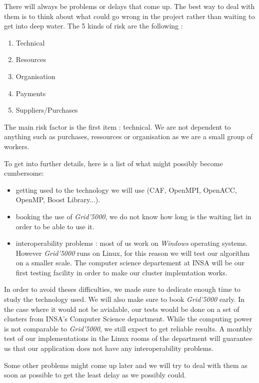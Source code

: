 There will always be problems or delays that come up. The best way to deal with them is to think about what could go wrong in the project rather than waiting to get into deep water. The 5 kinds of risk are the following :
\begin{enumerate}
	\item Technical
	\item Resources
	\item Organisation
	\item Payments
	\item Suppliers/Purchases
\end{enumerate}
The main risk factor is the first item : technical. We are not dependent to anything such as purchases, ressources or organisation as we are a small group of workers.

To get into further details, here is a list of what might possibly become cumbersome:
\begin{itemize}
	\item getting used to the technology we will use (CAF, OpenMPI, OpenACC, OpenMP, Boost Library...).
	\item booking the use of \textit{Grid'5000}, we do not know how long is the waiting list in order to be able to use it.
	\item interoperability problems : most of us work on \textit{Windows} operating systems. However \textit{Grid'5000} runs on Linux, for this reason we will test our algorithm on a smaller scale. The computer science departement at INSA will be our first testing facility in order to make our cluster implemtation works.
\end{itemize}
In order to avoid theses difficulties, we made sure to dedicate enough time to study the technology used. We will also make sure to book \textit{Grid'5000} early. In the case where it would not be avialable, our tests would be done on a set of clusters from INSA's Computer Science department. While the computing power is not comparable to \textit{Grid'5000}, we still expect to get reliable results. A monthly test of our implementations in the Linux rooms of the department will guarantee us that our application does not have any interoperability problems.

Some other problems might come up later and we will try to deal with them as soon as possible to get the least delay as we possibly could.~\\
